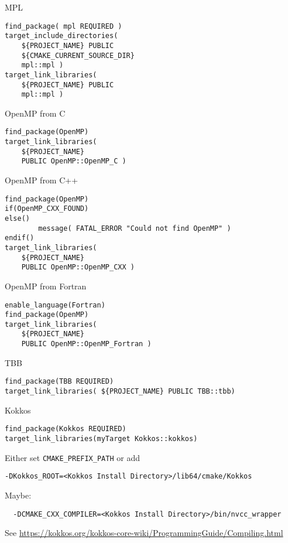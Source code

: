 \begin{numberedframe}{MPL}
\begin{lstlisting}
find_package( mpl REQUIRED )
target_include_directories(
	${PROJECT_NAME} PUBLIC
	${CMAKE_CURRENT_SOURCE_DIR}
	mpl::mpl )
target_link_libraries(
	${PROJECT_NAME} PUBLIC 
	mpl::mpl )
\end{lstlisting}
\end{numberedframe}

\begin{numberedframe}{OpenMP from C}
\begin{lstlisting}
find_package(OpenMP)
target_link_libraries(
    ${PROJECT_NAME}
    PUBLIC OpenMP::OpenMP_C )
\end{lstlisting}
\end{numberedframe}

\begin{numberedframe}{OpenMP from C++}
\begin{lstlisting}
find_package(OpenMP)
if(OpenMP_CXX_FOUND)
else()
        message( FATAL_ERROR "Could not find OpenMP" )
endif()
target_link_libraries(
    ${PROJECT_NAME}
    PUBLIC OpenMP::OpenMP_CXX )
\end{lstlisting}
\end{numberedframe}

\begin{numberedframe}{OpenMP from Fortran}
\begin{lstlisting}
enable_language(Fortran)
find_package(OpenMP)
target_link_libraries(
    ${PROJECT_NAME}
    PUBLIC OpenMP::OpenMP_Fortran )
\end{lstlisting}
\end{numberedframe}


\begin{numberedframe}{TBB}
\begin{lstlisting}
find_package(TBB REQUIRED)
target_link_libraries( ${PROJECT_NAME} PUBLIC TBB::tbb)
\end{lstlisting}
\end{numberedframe}

\begin{numberedframe}{Kokkos}
\begin{lstlisting}
find_package(Kokkos REQUIRED)
target_link_libraries(myTarget Kokkos::kokkos)
\end{lstlisting}
Either set \lstinline{CMAKE_PREFIX_PATH} or add
\begin{lstlisting}
-DKokkos_ROOT=<Kokkos Install Directory>/lib64/cmake/Kokkos
\end{lstlisting}
Maybe:
\begin{lstlisting}
  -DCMAKE_CXX_COMPILER=<Kokkos Install Directory>/bin/nvcc_wrapper
\end{lstlisting}
See \url{https://kokkos.org/kokkos-core-wiki/ProgrammingGuide/Compiling.html}
\end{numberedframe}

